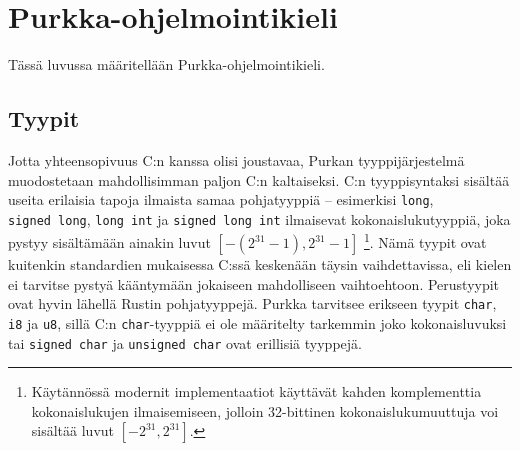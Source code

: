 \section{Purkka-ohjelmointikieli}
\label{sec:purkka}

Tässä luvussa määritellään Purkka-ohjelmointikieli.

\subsection{Tyypit}

Jotta yhteensopivuus C:n kanssa olisi joustavaa, Purkan tyyppijärjestelmä
muodostetaan mahdollisimman paljon C:n kaltaiseksi. C:n tyyppisyntaksi sisältää
useita erilaisia tapoja ilmaista samaa pohjatyyppiä -- esimerkisi
\texttt{long}, \texttt{signed~long}, \texttt{long~int} ja
\texttt{signed~long~int} ilmaisevat kokonaislukutyyppiä, joka pystyy
sisältämään ainakin luvut $[-(2^{31} - 1), 2^{31}-1]$ \footnote{Käytännössä
modernit implementaatiot käyttävät kahden komplementtia kokonaislukujen
ilmaisemiseen, jolloin 32-bittinen kokonaislukumuuttuja voi sisältää luvut
$[-2^{31}, 2^{31}]$.}\citationneeded. Nämä tyypit ovat kuitenkin standardien
mukaisessa C:ssä keskenään täysin vaihdettavissa, eli kielen ei tarvitse pystyä
kääntymään jokaiseen mahdolliseen vaihtoehtoon. Perustyypit ovat hyvin lähellä
Rustin pohjatyyppejä\citationneeded. Purkka tarvitsee erikseen tyypit
\texttt{char}, \texttt{i8} ja \texttt{u8}, sillä C:n \texttt{char}-tyyppiä ei
ole määritelty tarkemmin joko kokonaisluvuksi tai 
\texttt{signed char} ja \texttt{unsigned char} ovat erillisiä tyyppejä.


